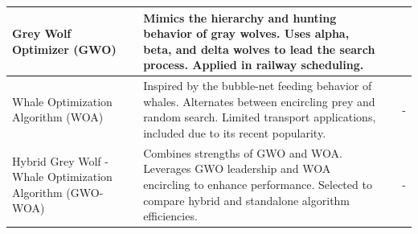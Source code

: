 \documentclass[Afour,sagev,times]{sagej}
\begin{document}
\begin{table}[ht]
\begin{tabular}{|>{\centering\arraybackslash}p{2.5cm}|p{7.5cm}|>{\centering\arraybackslash}p{2cm}|>{\centering\arraybackslash}p{2cm}|}
Grey Wolf Optimizer (GWO) & Mimics the hierarchy and hunting behavior of gray wolves. Uses alpha, beta, and delta wolves to lead the search process. Applied in railway scheduling. & \cite{Mirjalili14} & \cite{Yu23, Zhang24} \\ \hline
Whale Optimization Algorithm (WOA) & Inspired by the bubble-net feeding behavior of whales. Alternates between encircling prey and random search. Limited transport applications, included due to its recent popularity. & \cite{Mirjalili16} & - \\ \hline
Hybrid Grey Wolf - Whale Optimization Algorithm (GWO-WOA) & Combines strengths of GWO and WOA. Leverages GWO leadership and WOA encircling to enhance performance. Selected to compare hybrid and standalone algorithm efficiencies. & \cite{Obadina22} & - \\ \hline
\end{tabular}
\label{tab:algorithms_combined}
\end{table}




\end{document}
